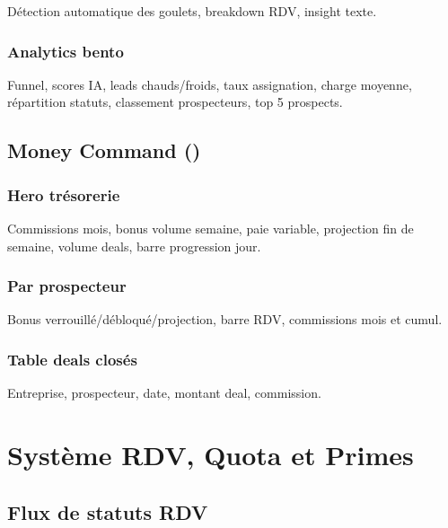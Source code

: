 \documentclass[11pt,a4paper]{report}
\begin{document}
Détection automatique des goulets, breakdown RDV, insight texte.

\subsection{Analytics bento}

Funnel, scores IA, leads chauds/froids, taux assignation, charge moyenne, répartition statuts, classement prospecteurs, top 5 prospects.

\section{Money Command ()}

\subsection{Hero trésorerie}

Commissions mois, bonus volume semaine, paie variable, projection fin de semaine, volume deals, barre progression jour.

\subsection{Par prospecteur}

Bonus verrouillé/débloqué/projection, barre RDV, commissions mois et cumul.

\subsection{Table deals closés}

Entreprise, prospecteur, date, montant deal, commission.

\chapter{Système RDV, Quota et Primes}

\section{Flux de statuts RDV}
\end{document}
